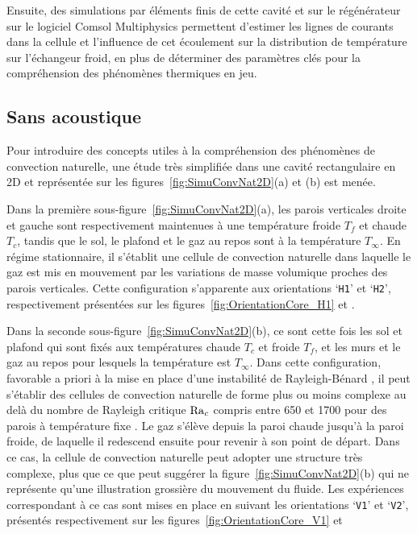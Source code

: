 Ensuite, des simulations par éléments finis de cette cavité et sur le régénérateur sur le logiciel Comsol Multiphysics permettent d'estimer les lignes de courants dans la cellule et l'influence de cet écoulement sur la distribution de température sur l'échangeur froid, en plus de déterminer des paramètres clés pour la compréhension des phénomènes thermiques en jeu.

\subsection{Sans acoustique}
Pour introduire des concepts utiles à la compréhension des phénomènes de convection naturelle, une étude très simplifiée dans une cavité rectangulaire en 2D et représentée sur les figures~\ref{fig:SimuConvNat2D}{\color{MatlabOrange}(a)} et {\color{MatlabOrange}(b)} est menée. 

Dans la première sous-figure~\ref{fig:SimuConvNat2D}{\color{MatlabOrange}(a)}, les parois verticales droite et gauche sont respectivement maintenues à une température froide $T_f$ et chaude $T_c$, tandis que le sol, le plafond et le gaz au repos sont à la température $T_\infty$. En régime stationnaire, il s'établit une cellule de convection naturelle dans laquelle le gaz est mis en mouvement par les  variations de masse volumique proches des parois verticales. Cette configuration s'apparente aux orientations `\texttt{H1}' et `\texttt{H2}', respectivement présentées sur les figures~\ref{fig:OrientationCore_H1} et .

Dans la seconde sous-figure~\ref{fig:SimuConvNat2D}{\color{MatlabOrange}(b)}, ce sont cette fois les sol et plafond qui sont fixés aux températures chaude $T_c$ et froide $T_f$, et les murs et le gaz au repos pour lesquels la température est $T_\infty$. Dans cette configuration, favorable a priori à la mise en place d'une instabilité de \og Rayleigh-Bénard \fg{}, il peut s'établir des cellules de convection naturelle de forme plus ou moins complexe au delà du nombre de Rayleigh critique $\mathrm{Ra}_c$ compris entre 650 et 1700 pour des parois à température fixe \cite{getling_rayleigh-benard_1998}. Le gaz s'élève depuis la paroi chaude jusqu'à la paroi froide, de laquelle il redescend ensuite pour revenir à son point de départ. Dans ce cas, la cellule de convection naturelle peut adopter une structure très complexe, plus que ce que peut suggérer la figure~\ref{fig:SimuConvNat2D}{\color{MatlabOrange}(b)} qui ne représente qu'une illustration grossière du mouvement du fluide. Les expériences correspondant à ce cas sont mises en place en suivant les orientations `\texttt{V1}' et `\texttt{V2}', présentés respectivement sur les figures~\ref{fig:OrientationCore_V1} et 

